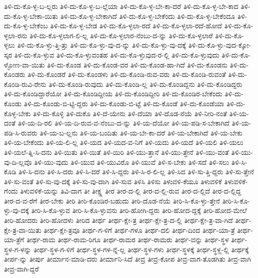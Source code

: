 {ತಿಳಿ-ದು-ಕೊ-ಳ್ಳ-ಬ-ಲ್ಲರು
ತಿಳಿ-ದು-ಕೊ-ಳ್ಳ-ಬ-ಲ್ಲೆಯಾ
ತಿಳಿ-ದು-ಕೊ-ಳ್ಳ-ಬೇ-ಕಾ-ದರೆ
ತಿಳಿ-ದು-ಕೊ-ಳ್ಳ-ಬೇ-ಕಾದ
ತಿಳಿ-ದು-ಕೊ-ಳ್ಳ-ಬೇಕಾ-ಯಿತು
ತಿಳಿ-ದು-ಕೊ-ಳ್ಳ-ಬೇಕಾಗಿದೆ
ತಿಳಿ-ದು-ಕೊ-ಳ್ಳ-ಬೇಕೆಂದು
ತಿಳಿ-ದು-ಕೊ-ಳ್ಳ-ಬೇಕೆಂದೂ
ತಿಳಿ-ದು-ಕೊ-ಳ್ಳ-ಬೇಕೆಂಬ
ತಿಳಿ-ದು-ಕೊ-ಳ್ಳ-ಬೇಡ
ತಿಳಿ-ದು-ಕೊ-ಳ್ಳಲಾ-ರದೆ
ತಿಳಿ-ದು-ಕೊ-ಳ್ಳಲಾ-ರದೆ-ಹೋದೆ
ತಿಳಿ-ದು-ಕೊ-ಳ್ಳಲಾ-ರನು
ತಿಳಿ-ದು-ಕೊ-ಳ್ಳಲಾಗ-ಲಿ-ಲ್ಲ
ತಿಳಿ-ದು-ಕೊ-ಳ್ಳಲಾರ-ನೆಂಬು-ದ-ನ್ನು
ತಿಳಿ-ದು-ಕೊ-ಳ್ಳಲಾರೆ
ತಿಳಿ-ದು-ಕೊ-ಳ್ಳಲು
ತಿಳಿ-ದು-ಕೊ-ಳ್ಳು-ತ್ತಿ-ತ್ತು
ತಿಳಿ-ದು-ಕೊ-ಳ್ಳು-ವು-ದ-ನ್ನು
ತಿಳಿ-ದು-ಕೊ-ಳ್ಳು-ವು-ದಕ್ಕೆ
ತಿಳಿ-ದು-ಕೊ-ಳ್ಳು-ವುದ-ಕ್ಕೋ-ಸ್ಕರ
ತಿಳಿ-ದು-ಕೊ-ಳ್ಳುವ
ತಿಳಿ-ದು-ಕೊ-ಳ್ಳುವಂತಹ
ತಿಳಿ-ದು-ಕೊ-ಳ್ಳುವುದ-ರ-ಲ್ಲಿ
ತಿಳಿ-ದು-ಕೊ-ಳ್ಳುವುದು
ತಿಳಿ-ದು-ಕೊ-ಳ್ಳೋಣ-ವಾ-ಯಿತು
ತಿಳಿ-ದು-ಕೊಂಡ
ತಿಳಿ-ದು-ಕೊಂಡ-ವರ
ತಿಳಿ-ದು-ಕೊಂಡ-ಹಾ-ಗಿದೆ
ತಿಳಿ-ದು-ಕೊಂಡನು
ತಿಳಿ-ದು-ಕೊಂಡರು
ತಿಳಿ-ದು-ಕೊಂಡರೆ
ತಿಳಿ-ದು-ಕೊಂಡಳು
ತಿಳಿ-ದು-ಕೊಂಡಿ-ರುವ-ವರು
ತಿಳಿ-ದು-ಕೊಂಡಿ-ರುವಂತೆ
ತಿಳಿ-ದು-ಕೊಂಡಿ-ರುವಿ-ರೇನು
ತಿಳಿ-ದು-ಕೊಂಡಿ-ರುವುದು
ತಿಳಿ-ದು-ಕೊಂಡಿ-ಲ್ಲ
ತಿಳಿ-ದು-ಕೊಂಡಿದ್ದನು
ತಿಳಿ-ದು-ಕೊಂಡಿದ್ದರು
ತಿಳಿ-ದು-ಕೊಂಡಿದ್ದಾರೆಯೋ
ತಿಳಿ-ದು-ಕೊಂಡಿದ್ದೀಯ
ತಿಳಿ-ದು-ಕೊಂಡಿದ್ದೀರಿ
ತಿಳಿ-ದು-ಕೊಂಡಿರ-ಬೇಕೆಂದು
ತಿಳಿ-ದು-ಕೊಂಡು
ತಿಳಿ-ದು-ಕೊಂಡು-ಬಿ-ಟ್ಟಿ-ದ್ದರು
ತಿಳಿ-ದು-ಕೊಂಡು-ಬಿ-ಟ್ಟೆ
ತಿಳಿ-ದು-ಕೊಂಡೆ
ತಿಳಿ-ದು-ಕೊಂಡೆಯಾ
ತಿಳಿ-ದು-ಕೊಳ್ಳ-ಬೇಕು
ತಿಳಿ-ದು-ಕೊಳ್ಳಿ
ತಿಳಿ-ದುಕೊ
ತಿಳಿ-ದೆ-ಯೇನು
ತಿಳಿ-ದೆಯಾ
ತಿಳಿ-ದೊಡ-ನೆಯೆ
ತಿಳಿ-ನೀರಿ-ನಂತೆ
ತಿಳಿ-ಯ-ದಂತೆ
ತಿಳಿ-ಯ-ದಿ-ರಲಿ
ತಿಳಿ-ಯ-ದಿ-ರುವ-ವ-ನೆಂಬು-ದ-ನ್ನು
ತಿಳಿ-ಯ-ದೆಯೋ
ತಿಳಿ-ಯ-ಪಡಿ-ಸ-ಬೇಕಾಗಿದೆ
ತಿಳಿ-ಯ-ಪಡಿ-ಸಿ-ರುವರು
ತಿಳಿ-ಯ-ಬ-ಲ್ಲನು
ತಿಳಿ-ಯ-ಬಂದಿತು
ತಿಳಿ-ಯ-ಬೇ-ಕಾ-ದರೆ
ತಿಳಿ-ಯ-ಬೇಕಾಗಿದೆ
ತಿಳಿ-ಯ-ಬೇಕು
ತಿಳಿ-ಯ-ಬೇಕೆಂದು
ತಿಳಿ-ಯ-ಲಿ-ಲ್ಲ
ತಿಳಿ-ಯದ
ತಿಳಿ-ಯದ-ವ-ನಿಗೆ
ತಿಳಿ-ಯದು
ತಿಳಿ-ಯದೆ
ತಿಳಿ-ಯಲಿ
ತಿಳಿ-ಯಲು
ತಿಳಿ-ಯಲೆ-ತ್ನಿ-ಸಿ-ದನು
ತಿಳಿ-ಯಿತು
ತಿಳಿ-ಯಿತೆ
ತಿಳಿ-ಯಿರಿ
ತಿಳಿ-ಯು-ತ್ತಾನೆ
ತಿಳಿ-ಯು-ತ್ತೇನೆ
ತಿಳಿ-ಯು-ವಂತೆ
ತಿಳಿ-ಯು-ವು-ದಿ-ಲ್ಲವೊ
ತಿಳಿ-ಯು-ವುದು
ತಿಳಿ-ಯುವ
ತಿಳಿ-ಯುವಿರೊ
ತಿಳಿ-ಯುವೆ
ತಿಳಿ-ಸ-ಬೇಕು
ತಿಳಿ-ಸದೆ
ತಿಳಿ-ಸಲು
ತಿಳಿ-ಸಿ-ಕೊಡಿ
ತಿಳಿ-ಸಿ-ದನು
ತಿಳಿ-ಸಿ-ದರು
ತಿಳಿ-ಸಿ-ದರೆ
ತಿಳಿ-ಸಿ-ದ್ದರು
ತಿಳಿ-ಸಿ-ರ-ಲಿ-ಲ್ಲ
ತಿಳಿ-ಸಿದ
ತಿಳಿ-ಸು-ತ್ತಿ-ದ್ದರು
ತಿಳಿ-ಸು-ತ್ತೇನೆ
ತಿಳಿ-ಸು-ವಂತೆ
ತಿಳಿ-ಸು-ವು-ದಕ್ಕೆ
ತಿಳಿ-ಸು-ವು-ದಾಗಿ
ತಿಳಿ-ಸುವ
ತಿಳಿಸಿ
ತಿಳಿಸು
ತಿಳುವಳಿ-ಕೆಯೂ
ತಿಳುವಳಿಕೆ
ತಿಳುವಳಿಕೆ-ಗೆಂದು
ತಿಳುವಳಿಕೆ-ಯನ್ನು
ತಿವಿ-ದಾಗ
ತೀ
ತೀಕ್ಷ್ಣ
ತೀರ
ತೀರ-ದ-ಲ್ಲಿ
ತೀರ-ದ-ಲ್ಲಿ-ರುವ
ತೀರ-ದ-ಲ್ಲಿದೆ
ತೀರ-ದ-ಲ್ಲಿದ್ದ
ತೀರ-ದ-ವ-ರೆಗೆ
ತೀರ-ಬೇಕು
ತೀರಿ
ತೀರಿ-ಕೊಂಡಿರ-ಬಹುದು
ತೀರಿ-ದೊಡ-ನೆಯೆ
ತೀರಿ-ಸಿ-ಕೊ-ಳ್ಳು-ತ್ತೇನೆ
ತೀರಿ-ಸಿ-ಕೊ-ಳ್ಳು-ವು-ದಕ್ಕೆ
ತೀರಿ-ಸಿ-ಕೊ-ಳ್ಳುವ
ತೀರಿ-ಸಿ-ಕೊ-ಳ್ಳುವನು
ತೀರಿ-ಹೋಗಿ-ದ್ದರು
ತೀರಿ-ಹೋದ-ದ್ದಕ್ಕೆ
ತೀರಿ-ಹೋದ-ಮೇಲೆ
ತೀರಿ-ಹೋದರು
ತೀರಿ-ಹೋದಳು
ತೀರಿದ
ತೀರ್ಥ
ತೀರ್ಥ-ಕ್ಷೇ-ತ್ರ
ತೀರ್ಥ-ಕ್ಷೇ-ತ್ರ-ದ-ಲ್ಲಿ
ತೀರ್ಥ-ಕ್ಷೇ-ತ್ರ-ವಾ-ಗಿದೆ
ತೀರ್ಥ-ಕ್ಷೇ-ತ್ರ-ವಾ-ಯಿತು
ತೀರ್ಥ-ಕ್ಷೇ-ತ್ರವೂ
ತೀರ್ಥ-ಗ-ಳಿಗೆ
ತೀರ್ಥ-ಗಳೂ
ತೀರ್ಥ-ದಲಿ
ತೀರ್ಥ-ದಿಂದ
ತೀರ್ಥ-ಯಾ-ತ್ರೆ
ತೀರ್ಥ-ಯಾ-ತ್ರೆಗೆ
ತೀರ್ಥ-ರಾಮ
ತೀರ್ಥ-ರಾಮ-ರಿಗೂ
ತೀರ್ಥ-ರಾಮರ
ತೀರ್ಥ-ರಾಮರು
ತೀರ್ಥ-ವನ್ನು
ತೀರ್ಥ-ಸ್ಥಳ
ತೀರ್ಥ-ಸ್ಥಳ-ಗ-ಳನ್ನು
ತೀರ್ಥ-ಸ್ಥಳ-ಗ-ಳಿಗೆ
ತೀರ್ಥ-ಸ್ಥಳ-ಗಳ-ನ್ನೆ-ಲ್ಲ
ತೀರ್ಥ-ಸ್ಥಳ-ಗಳು
ತೀರ್ಥ-ಸ್ಥಳಕ್ಕೆ
ತೀರ್ಥ-ಸ್ಥಳ್ದ-ಲ್ಲಿ
ತೀರ್ಥಕ್ಕೆ
ತೀರ್ಪ-ನ್ನು
ತೀರ್ಪು
ತೀರ್ಮಾನ-ಮಾಡಿ-ದರು
ತೀರ್ಮಾನಿ-ಸಿದೆ
ತೀವ್ರ
ತೀವ್ರ-ಕೋಪ
ತೀವ್ರ-ವಾಗ-ತೊಡಗಿತು
ತೀವ್ರ-ವಾಗಿ
ತೀವ್ರ-ವಾಗಿ-ದ್ದರೆ
}
